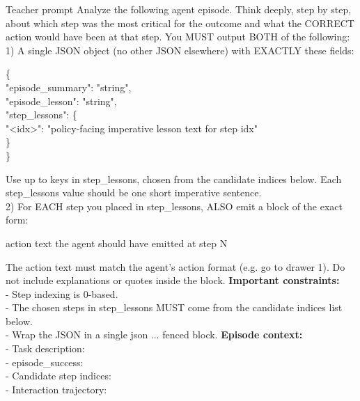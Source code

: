\begin{promptbox}{Teacher prompt}
Analyze the following agent episode. Think deeply, step by step, about which step was the most critical for the outcome and what the CORRECT action would have been at that step.
\promptsep
You MUST output BOTH of the following:\\[5pt]
1) A single JSON object (no other JSON elsewhere) with EXACTLY these fields:
\begin{promptcard}
\{\\
\hspace*{2ex}"episode\_summary": "string",\\
\hspace*{2ex}"episode\_lesson": "string",\\
\hspace*{2ex}"step\_lessons": \{\\
\hspace*{4ex}"<idx>": "policy-facing imperative lesson text for step idx"\\
\hspace*{2ex}\}\\
\}
\end{promptcard}
Use up to  keys in step\_lessons, chosen from the candidate indices below. Each step\_lessons value should be one short imperative sentence.\\[5pt]
2) For EACH step you placed in step\_lessons, ALSO emit a block of the exact form:
\begin{promptcard}
action text the agent should have emitted at step N
\end{promptcard}
The action text must match the agent's action format (e.g. go to drawer 1). Do not include explanations or quotes inside the block.
\promptsep
\textbf{Important constraints:}\\
- Step indexing is 0-based.\\
- The chosen steps in step\_lessons MUST come from the candidate indices list below.\\
- Wrap the JSON in a single \textasciigrave\textasciigrave\textasciigrave json ...\textasciigrave\textasciigrave\textasciigrave{} fenced block.
\promptsep
\textbf{Episode context:}\\
- Task description: \\
- episode\_success: \\
- Candidate step indices: \\
- Interaction trajectory: 
\end{promptbox}

